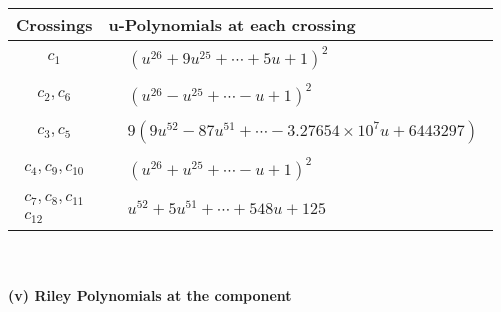 \documentclass[1p]{elsarticle_modified}
\theoremstyle{definition}
\begin{document}
\begin{tabular}{m{50pt}|m{274pt}}
Crossings & \hspace{64pt}u-Polynomials at each crossing \\
\hline $$\begin{aligned}c_{1}\end{aligned}$$&$\begin{aligned}
&(u^{26}+9 u^{25}+\cdots+5 u+1)^{2}
\end{aligned}$\\
\hline $$\begin{aligned}c_{2},c_{6}\end{aligned}$$&$\begin{aligned}
&(u^{26}- u^{25}+\cdots- u+1)^{2}
\end{aligned}$\\
\hline $$\begin{aligned}c_{3},c_{5}\end{aligned}$$&$\begin{aligned}
&9(9 u^{52}-87 u^{51}+\cdots-3.27654\times10^{7} u+6443297)
\end{aligned}$\\
\hline $$\begin{aligned}c_{4},c_{9},c_{10}\end{aligned}$$&$\begin{aligned}
&(u^{26}+u^{25}+\cdots- u+1)^{2}
\end{aligned}$\\
\hline $$\begin{aligned}c_{7},c_{8},c_{11}\\c_{12}\end{aligned}$$&$\begin{aligned}
&u^{52}+5 u^{51}+\cdots+548 u+125
\end{aligned}$\\
\hline
\end{tabular}\\~\\
\newpage\renewcommand{\arraystretch}{1}
\flushleft \textbf{(v) Riley Polynomials at the component}\newline \\
\end{document}
